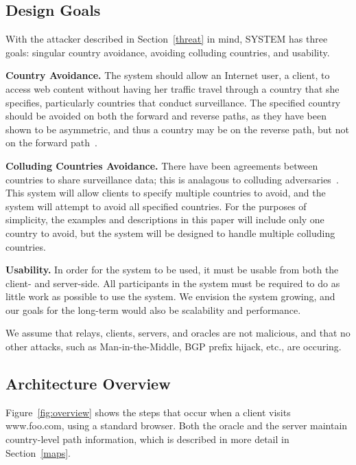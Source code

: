 \subsection{Design Goals}

With the attacker described in Section~\ref{threat} in mind, SYSTEM has three goals: singular country avoidance, avoiding colluding countries, and usability.  

{\bf Country Avoidance.}  The system should allow an Internet user, a client, to access web content without having her traffic travel through a country that she specifies, particularly countries that conduct surveillance.  The specified country should be avoided on both the forward and reverse paths, as they have been shown to be asymmetric, and thus a country may be on the reverse path, but not on the forward path~\cite{he2005routing}.  

{\bf Colluding Countries Avoidance.}  There have been agreements between countries to share surveillance data; this is analagous to colluding adversaries~\cite{fiveeyes}.  This system will allow clients to specify multiple countries to avoid, and the system will attempt to avoid all specified countries.  For the purposes of simplicity, the examples and descriptions in this paper will include only one country to avoid, but the system will be designed to handle multiple colluding countries.

{\bf Usability.} In order for the system to be used, it must be usable from both the client- and server-side.  All participants in the system must be required to do as little work as possible to use the system.  We envision the system growing, and our goals for the long-term would also be scalability and performance.

We assume that relays, clients, servers, and oracles are not malicious, and that no other attacks, such as Man-in-the-Middle, BGP prefix hijack, etc., are occuring.  

\subsection{Architecture Overview}

Figure~\ref{fig:overview} shows the steps that occur when a client visits www.foo.com, using a standard browser.  Both the oracle and the server maintain country-level path information, which is described in more detail in Section~\ref{maps}.


